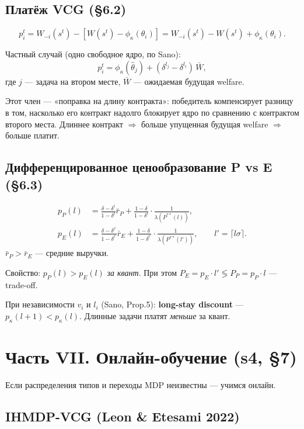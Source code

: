 \documentclass[11pt,a4paper]{article}
\begin{document}
\subsection{Платёж VCG (§6.2)}

\[
p_i^t = W_{-i}(s^t) - [W(s^t) - \phi_\kappa(\theta_i)]
      = W_{-i}(s^t) - W(s^t) + \phi_\kappa(\theta_i).
\]

Частный случай (одно свободное ядро, по Sano):
\[
p_i^t = \phi_\kappa(\hat\theta_j) + (\delta^{l_j}-\delta^{l_i})\,\bar W,
\]
где $j$ — задача на втором месте, $\bar W$ — ожидаемая будущая welfare.

\begin{why}
Этот член — «поправка на длину контракта»: победитель компенсирует
разницу в том, насколько его контракт надолго блокирует ядро по
сравнению с контрактом второго места. Длиннее контракт $\Rightarrow$
больше упущенная будущая welfare $\Rightarrow$ больше платит.
\end{why}

\subsection{Дифференцированное ценообразование P vs E (§6.3)}

\begin{align*}
p_P(l) &= \frac{\delta-\delta^l}{1-\delta^l}\bar r_P
   + \frac{1-\delta}{1-\delta^l}\cdot\frac{1}{\lambda(P^{**}(l))},\\
p_E(l) &= \frac{\delta-\delta^{l'}}{1-\delta^{l'}}\bar r_E
   + \frac{1-\delta}{1-\delta^{l'}}\cdot\frac{1}{\lambda(P^{**}(l'))},
\qquad l'=\lceil l\sigma\rceil.
\end{align*}
$\bar r_P>\bar r_E$ — средние выручки.

Свойство: $p_P(l)>p_E(l)$ \emph{за квант}. При этом
$P_E=p_E\cdot l' \lessgtr P_P=p_P\cdot l$ — trade-off.

При независимости $v_i$ и $l_i$ (Sano, Prop.5): \textbf{long-stay
discount} — $p_\kappa(l+1) < p_\kappa(l)$. Длинные задачи платят
\emph{меньше} за квант.

\section{Часть VII. Онлайн-обучение (s4, §7)}

Если распределения типов и переходы MDP неизвестны — учимся онлайн.

\subsection{IHMDP-VCG (Leon \& Etesami 2022)}
\end{document}
